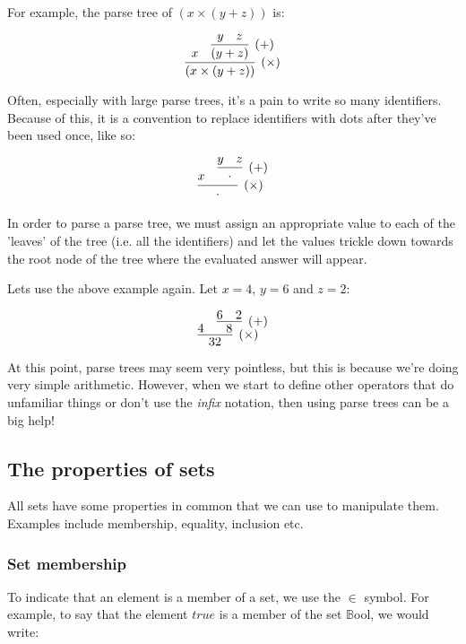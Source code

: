 \documentclass{article}
\newcommand{\parsetreedot}{\phantom{|}\cdot\phantom{|}}
\begin{document}
For example, the parse tree of $(x \times (y + z))$ is:


\[
	\infer[(\times)]{(x \times (y + z))}{
		x
		&
		\infer[(+)]{(y + z)}{
			y
			&
			z
		}
	}
\]

Often, especially with large parse trees, it's a pain to write so many
identifiers. Because of this, it is a convention to replace identifiers with
dots after they've been used once, like so:

\[
	\infer[(\times)]{\parsetreedot} {
		x
		&
		\infer[(+)]{\parsetreedot} {
			y
			&
			z
		}
	}
\]

In order to parse a parse tree, we must assign an appropriate value to each of
the 'leaves' of the tree (i.e. all the identifiers) and let the values trickle
down towards the root node of the tree where the evaluated answer will appear.

Lets use the above example again. Let $x = 4$, $y = 6$ and $z = 2$:

\[
	\infer[(\times)]{32} {
		4
		&
		\infer[(+)]{8} {
			6
			&
			2
		}
	}
\]


At this point, parse trees may seem very pointless, but this is because we're
doing very simple arithmetic. However, when we start to define other operators
that do unfamiliar things or don't use the {\it infix} notation,
then using parse trees can be a big help!

\subsection{The properties of sets}

All sets have some properties in common that we can use to manipulate them. Examples include membership, equality, inclusion etc.

\subsubsection{Set membership}

To indicate that an element is a member of a set, we use the $\in$ symbol. For example, to say that the element $true$ is a member of the set $\mathbb{B}$ool, we would write:
\end{document}
